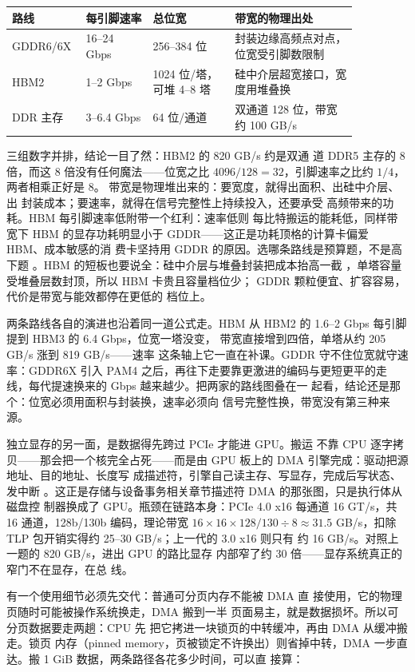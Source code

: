 \begin{longtable}{L{0.13\linewidth}L{0.18\linewidth}L{0.22\linewidth}L{0.33\linewidth}}
\toprule
路线 & 每引脚速率 & 总位宽 & 带宽的物理出处 \\
\midrule
GDDR6/6X & 16--24 Gbps & 256--384 位 & 封装边缘高频点对点，位宽受引脚数限制 \\\tablerowrule
HBM2 & 1--2 Gbps & 1024 位/塔，可堆 4--8 塔 & 硅中介层超宽接口，宽度用堆叠换 \\\tablerowrule
DDR 主存 & 3--6.4 Gbps & 64 位/通道 & 双通道 128 位，带宽约 100 GB/s \\
\bottomrule
\end{longtable}

三组数字并排，结论一目了然：HBM2 的 820 GB/s 约是双通
道 DDR5 主存的 8 倍，而这 8 倍没有任何魔法——位宽之比
$4096/128=32$，引脚速率之比约 $1/4$，两者相乘正好是 8。
带宽是物理堆出来的：要宽度，就得出面积、出硅中介层、出
封装成本；要速率，就得在信号完整性上持续投入，还要承受
高频带来的功耗。HBM 每引脚速率低附带一个红利：速率低则
每比特搬运的能耗低，同样带宽下 HBM 的显存功耗明显小于
GDDR——这正是功耗顶格的计算卡偏爱 HBM、成本敏感的消
费卡坚持用 GDDR 的原因。选哪条路线是预算题，不是高下题
。HBM 的短板也要说全：硅中介层与堆叠封装把成本抬高一截
，单塔容量受堆叠层数封顶，所以 HBM 卡贵且容量档位少；
GDDR 颗粒便宜、扩容容易，代价是带宽与能效都停在更低的
档位上。

两条路线各自的演进也沿着同一道公式走。HBM 从 HBM2 的
1.6--2 Gbps 每引脚提到 HBM3 的 6.4 Gbps，位宽一塔没变，
带宽直接增到四倍，单塔从约 205 GB/s 涨到 819 GB/s——速率
这条轴上它一直在补课。GDDR 守不住位宽就守速率：GDDR6X
引入 PAM4 之后，再往下走要靠更激进的编码与更短更平的走
线，每代提速换来的 Gbps 越来越少。把两家的路线图叠在一
起看，结论还是那个：位宽必须用面积与封装换，速率必须向
信号完整性换，带宽没有第三种来源。

独立显存的另一面，是数据得先跨过 PCIe 才能进 GPU。搬运
不靠 CPU 逐字拷贝——那会把一个核完全占死——而是由
GPU 板上的 DMA 引擎完成：驱动把源地址、目的地址、长度写
成描述符，引擎自己读主存、写显存，完成后写状态、发中断
。这正是存储与设备事务相关章节描述符 DMA 的那张图，只是执行体从磁盘控
制器换成了 GPU。瓶颈在链路本身：PCIe 4.0 x16 每通道
16 GT/s，共 16 通道，128b/130b 编码，理论带宽
$16\times16\times128/130\div8\approx31.5$ GB/s，扣除
TLP 包开销实得约 25--30 GB/s；上一代的 3.0 x16 则只有
约 16 GB/s。对照上一题的 820 GB/s，进出 GPU 的路比显存
内部窄了约 30 倍——显存系统真正的窄门不在显存，在总
线。

有一个使用细节必须先交代：普通可分页内存不能被 DMA 直
接使用，它的物理页随时可能被操作系统换走，DMA 搬到一半
页面易主，就是数据损坏。所以可分页数据要走两趟：CPU 先
把它拷进一块锁页的中转缓冲，再由 DMA 从缓冲搬走。锁页
内存（pinned memory，页被锁定不许换出）则省掉中转，DMA
一步直达。搬 1 GiB 数据，两条路径各花多少时间，可以直
接算：

